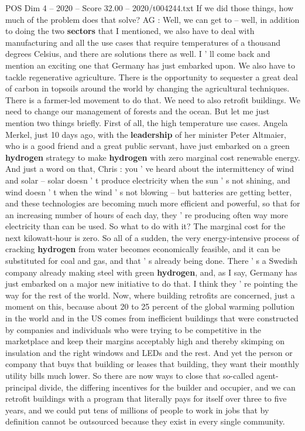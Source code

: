 \begin{textsample}{POS Dim 4 – 2020 – Score 32.00 – 2020/t004244.txt}
If we did those things, how much of the problem does that solve?
AG : Well, we can get to -- well, in addition to doing the two \textbf{sectors} that I mentioned, we also have to deal with manufacturing and all the use cases that require temperatures of a thousand degrees Celsius, and there are solutions there as well.
I ' ll come back and mention an exciting one that Germany has just embarked upon.
We also have to tackle regenerative agriculture.
There is the opportunity to sequester a great deal of carbon in topsoils around the world by changing the agricultural techniques.
There is a farmer-led movement to do that.
We need to also retrofit buildings.
We need to change our management of forests and the ocean.
But let me just mention two things briefly.
First of all, the high temperature use cases.
Angela Merkel, just 10 days ago, with the \textbf{leadership} of her minister Peter Altmaier, who is a good friend and a great public servant, have just embarked on a green \textbf{hydrogen} strategy to make \textbf{hydrogen} with zero marginal cost renewable energy.
And just a word on that, Chris : you ' ve heard about the intermittency of wind and solar -- solar doesn ' t produce electricity when the sun ' s not shining, and wind doesn ' t when the wind ' s not blowing -- but batteries are getting better, and these technologies are becoming much more efficient and powerful, so that for an increasing number of hours of each day, they ' re producing often way more electricity than can be used.
So what to do with it?
The marginal cost for the next kilowatt-hour is zero.
So all of a sudden, the very energy-intensive process of cracking \textbf{hydrogen} from water becomes economically feasible, and it can be substituted for coal and gas, and that ' s already being done.
There ' s a Swedish company already making steel with green \textbf{hydrogen}, and, as I say, Germany has just embarked on a major new initiative to do that.
I think they ' re pointing the way for the rest of the world.
Now, where building retrofits are concerned, just a moment on this, because about 20 to 25 percent of the global warming pollution in the world and in the US comes from inefficient buildings that were constructed by companies and individuals who were trying to be competitive in the marketplace and keep their margins acceptably high and thereby skimping on insulation and the right windows and LEDs and the rest.
And yet the person or company that buys that building or leases that building, they want their monthly utility bills much lower.
So there are now ways to close that so-called agent-principal divide, the differing incentives for the builder and occupier, and we can retrofit buildings with a program that literally pays for itself over three to five years, and we could put tens of millions of people to work in jobs that by definition cannot be outsourced because they exist in every single community.

\end{textsample}
